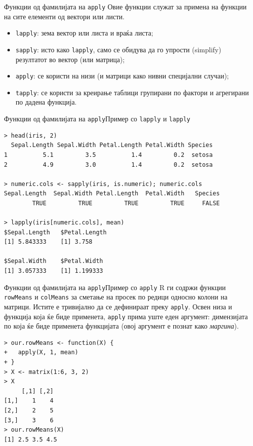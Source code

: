 \documentclass[hyperref={unicode}, xcolor={svgnames, table},
usepdftitle=false]{beamer}
\theoremstyle{remark}
\begin{document}
\begin{frame}{Функции од фамилијата на \texttt{apply}}
  Овие функции служат за примена на функции на сите елементи од вектори или листи.
  \begin{itemize}
  \item \texttt{lapply}: зема вектор или листа и враќа листа;
  \item \texttt{sapply}: исто како \texttt{lapply}, само се
    обидува да го упрости (simplify) резултатот во вектор (или матрица);
  \item \texttt{apply}: се користи на низи (и матрици како нивни специјални случаи);
  \item \texttt{tapply}: се користи за креирање таблици групирани по
    фактори и агрегирани по дадена функција.
  \end{itemize}
\end{frame}

\begin{frame}[fragile]{Функции од фамилијата на \texttt{apply}}{Пример со
    \texttt{lapply} и \texttt{lapply}}
\begin{verbatim}
> head(iris, 2)
  Sepal.Length Sepal.Width Petal.Length Petal.Width Species
1          5.1         3.5          1.4         0.2  setosa
2          4.9         3.0          1.4         0.2  setosa

> numeric.cols <- sapply(iris, is.numeric); numeric.cols
Sepal.Length  Sepal.Width Petal.Length  Petal.Width   Species
        TRUE         TRUE         TRUE         TRUE     FALSE

> lapply(iris[numeric.cols], mean)
$Sepal.Length   $Petal.Length
[1] 5.843333    [1] 3.758

$Sepal.Width    $Petal.Width
[1] 3.057333    [1] 1.199333
\end{verbatim}
\end{frame}

\begin{frame}[fragile]{Функции од фамилијата на \texttt{apply}}{Пример со
    \texttt{apply}}
  R ги содржи функции \texttt{rowMeans} и \texttt{colMeans} за
  сметање на просек по редици односно колони на матрици.  Истите е тривијално да
  се дефинираат преку \texttt{apply}.  Освен низа и функција која ќе биде
  применета, \texttt{apply} прима уште еден аргумент: димензијата по која
  ќе биде применета функцијата (овој аргумент е познат како \emph{маргина}).
\begin{verbatim}
> our.rowMeans <- function(X) {
+   apply(X, 1, mean)
+ }
> X <- matrix(1:6, 3, 2)
> X
     [,1] [,2]
[1,]    1    4
[2,]    2    5
[3,]    3    6
> our.rowMeans(X)
[1] 2.5 3.5 4.5
\end{verbatim}
\end{frame}
\end{document}
